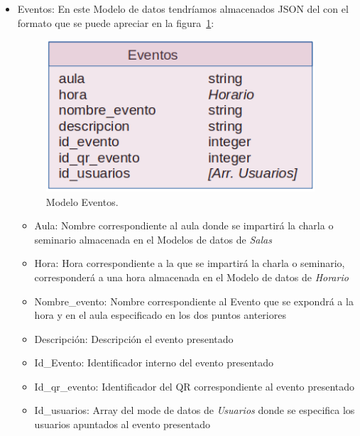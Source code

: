 \documentclass[a4paper, 12pt]{book}
\begin{document}
\begin{itemize}
	\item Eventos: En este Modelo de datos tendríamos almacenados JSON del con el formato que se puede apreciar en la figura~\ref{fig:mongoDBEventos}:
	\begin{figure}[h!]
  	\centering
  	\includegraphics[width=10cm, keepaspectratio]{img/mongoDBEventos.png}
  	\caption{Modelo Eventos.}\label{fig:mongoDBEventos}
	\end{figure}
		\begin{itemize}
		\item Aula: Nombre correspondiente al aula donde se impartirá la charla o seminario almacenada en el Modelos de datos de \textit{Salas}
		\item Hora: Hora correspondiente a la que se impartirá la charla o seminario, corresponderá a una hora almacenada en el Modelo de datos de \textit{Horario}
		\item Nombre\_evento: Nombre correspondiente al Evento que se expondrá a la hora y en el aula especificado en los dos puntos anteriores
		\item Descripción: Descripción el evento presentado
		\item Id\_Evento: Identificador interno del evento presentado
		\item Id\_qr\_evento: Identificador del QR correspondiente al evento presentado
		\item Id\_usuarios: Array del mode de datos de \textit{Usuarios} donde se especifica los usuarios apuntados al evento presentado
		\end{itemize}
		

\end{itemize}
\end{document}
